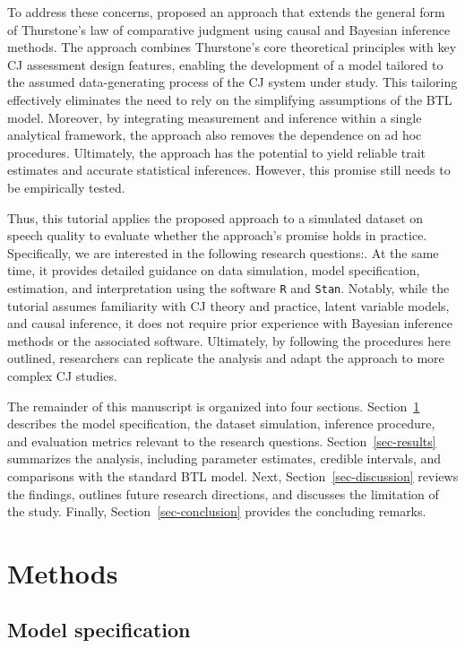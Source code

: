 \documentclass[
  authoryear,
  review,
  1p]{elsarticle}
\begin{document}
To address these concerns, \citet{Rivera_et_al_2025} proposed an
approach that extends the general form of Thurstone's law of comparative
judgment \citep{Thurstone_1927a, Thurstone_1927b} using causal and
Bayesian inference methods. The approach combines Thurstone's core
theoretical principles with key CJ assessment design features, enabling
the development of a model tailored to the assumed data-generating
process of the CJ system under study. This tailoring effectively
eliminates the need to rely on the simplifying assumptions of the BTL
model. Moreover, by integrating measurement and inference within a
single analytical framework, the approach also removes the dependence on
ad hoc procedures. Ultimately, the approach has the potential to yield
reliable trait estimates and accurate statistical inferences. However,
this promise still needs to be empirically tested.

Thus, this tutorial applies the proposed approach to a simulated dataset
on speech quality to evaluate whether the approach's promise holds in
practice. {Specifically, we are interested in the following research
questions:}. At the same time, it provides detailed guidance on data
simulation, model specification, estimation, and interpretation using
the software \texttt{R} and \texttt{Stan}. Notably, while the tutorial
assumes familiarity with CJ theory and practice, latent variable models,
and causal inference, it does not require prior experience with Bayesian
inference methods or the associated software. Ultimately, by following
the procedures here outlined, researchers can replicate the analysis and
adapt the approach to more complex CJ studies.

The remainder of this manuscript is organized into four sections.
Section~\ref{sec-methods} describes the model specification, the dataset
simulation, inference procedure, and evaluation metrics relevant to the
research questions. Section~\ref{sec-results} summarizes the analysis,
including parameter estimates, credible intervals, and comparisons with
the standard BTL model. Next, Section~\ref{sec-discussion} reviews the
findings, outlines future research directions, and discusses the
limitation of the study. Finally, Section~\ref{sec-conclusion} provides
the concluding remarks.

\section{Methods}\label{sec-methods}

\subsection{Model specification}\label{sec-model}
\end{document}
